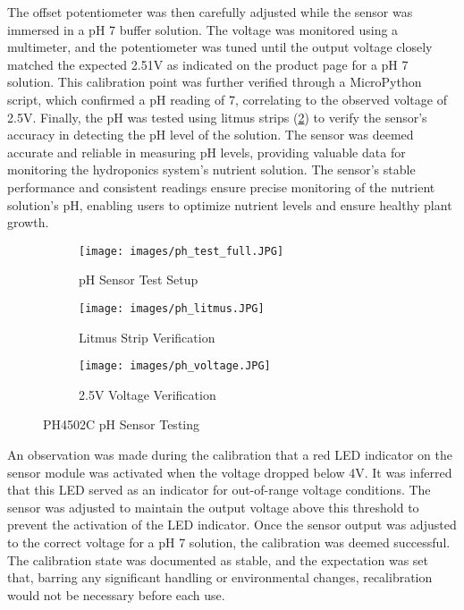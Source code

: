 \documentclass[12pt]{article} %
\begin{document}
\newline
\newline
\noindent The offset potentiometer was then carefully adjusted while the sensor was immersed in a pH 7 buffer solution. The voltage was monitored using a multimeter, and the potentiometer was tuned until the output voltage closely matched the expected 2.51V as indicated on the product page for a pH 7 solution. This calibration point was further verified through a MicroPython script, which confirmed a pH reading of 7, correlating to the observed voltage of 2.5V. Finally, the pH was tested using litmus strips (\ref{fig:ph_litmus}) to verify the sensor's accuracy in detecting the pH level of the solution. The sensor was deemed accurate and reliable in measuring pH levels, providing valuable data for monitoring the hydroponics system's nutrient solution. The sensor's stable performance and consistent readings ensure precise monitoring of the nutrient solution's pH, enabling users to optimize nutrient levels and ensure healthy plant growth.
\begin{figure}[H]
    \centering
    \begin{subfigure}[b]{0.3\textwidth}
        \centering
        \texttt{[image: images/ph\_test\_full.JPG]}
        \caption{pH Sensor Test Setup}
        \label{fig:ph_test_full}
    \end{subfigure}
    \hfill
    \begin{subfigure}[b]{0.3\textwidth}
        \centering
        \texttt{[image: images/ph\_litmus.JPG]}
        \caption{Litmus Strip Verification}
        \label{fig:ph_litmus}
    \end{subfigure}
    \hfill
    \begin{subfigure}[b]{0.3\textwidth}
        \centering
        \texttt{[image: images/ph\_voltage.JPG]}
        \caption{2.5V Voltage Verification}
        \label{fig:ph_voltage}
    \end{subfigure}
    \caption{PH4502C pH Sensor Testing}
    \label{fig:phTestingComposite}
\end{figure}

\noindent An observation was made during the calibration that a red LED indicator on the sensor module was activated when the voltage dropped below 4V. It was inferred that this LED served as an indicator for out-of-range voltage conditions. The sensor was adjusted to maintain the output voltage above this threshold to prevent the activation of the LED indicator.
Once the sensor output was adjusted to the correct voltage for a pH 7 solution, the calibration was deemed successful. The calibration state was documented as stable, and the expectation was set that, barring any significant handling or environmental changes, recalibration would not be necessary before each use. 
\end{document}
